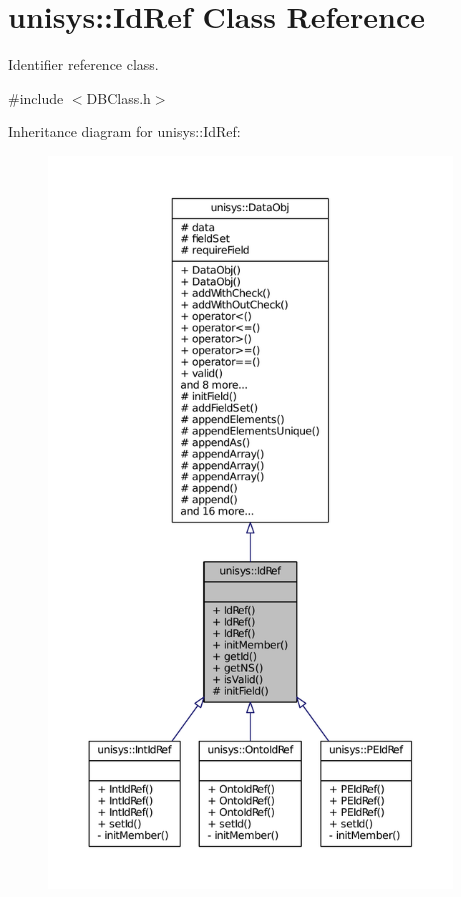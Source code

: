 \hypertarget{classunisys_1_1IdRef}{\section{unisys\-:\-:Id\-Ref Class Reference}
\label{classunisys_1_1IdRef}
}


Identifier reference class.  




{\ttfamily \#include $<$D\-B\-Class.\-h$>$}



Inheritance diagram for unisys\-:\-:Id\-Ref\-:
\nopagebreak
\begin{figure}[H]
\begin{center}
\leavevmode
\includegraphics[height=550pt]{classunisys_1_1IdRef__inherit__graph}
\end{center}
\end{figure}


